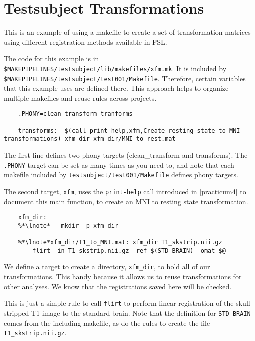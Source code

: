 \section{Testsubject Transformations}
\def\sectionautorefname{Testsubject Transformations}
\label{sec:testsubjectxfm}

This is an example of using a makefile to create a set of transformation matrices using different registration methods available in FSL. 

The code for this example is in \texttt{\$MAKEPIPELINES/testsubject/lib/makefiles/xfm.mk}. It is included by \texttt{\$MAKEPIPELINES/testsubject/test001/Makefile}. Therefore, certain variables that this example uses are defined there. This approach helps to organize multiple makefiles and reuse rules across projects.

\setcounter{codehighlight}{0} %
\begin{lstlisting}
	.PHONY=clean_transform tranforms 

	transforms:  $(call print-help,xfm,Create resting state to MNI transformations) xfm_dir xfm_dir/MNI_to_rest.mat
\end{lstlisting}

The first line defines two phony targets (clean\_transform and transforms). The \texttt{.PHONY} target can be set as many times as you need to, and note that each makefile included by \texttt{testsubject/test001/Makefile} defines phony targets. 

The second target, \texttt{xfm}, uses the \texttt{print-help} call introduced in \autoref{practicum4} to document this main function, to create an MNI to resting state transformation.

\begin{lstlisting}
	xfm_dir:
	%*\lnote*	mkdir -p xfm_dir

	%*\lnote*xfm_dir/T1_to_MNI.mat: xfm_dir T1_skstrip.nii.gz 
		flirt -in T1_skstrip.nii.gz -ref $(STD_BRAIN) -omat $@
\end{lstlisting}

 We define a target to create a directory, \texttt{xfm_dir},
to hold all of our transformations. This handy because it allows us to
reuse transformations for other analyses. We know that
the registrations saved here will be checked. 

 This is just a simple rule to call \texttt{flirt} to perform
linear registration of the skull stripped T1 image to the standard
brain. Note that the definition for \texttt{STD_BRAIN} comes from the
including makefile, as do the rules to create the file \texttt{T1_skstrip.nii.gz}.

